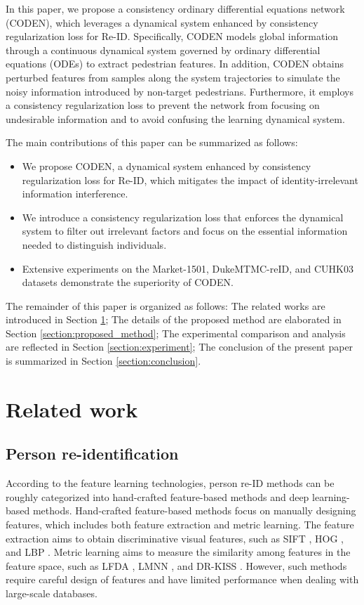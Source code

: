 \documentclass[12pt]{spieman}  %
\begin{document}
\begin{spacing}{2}
		In this paper, we propose a consistency ordinary differential equations network (CODEN), which leverages a dynamical system enhanced by consistency regularization loss for Re-ID. Specifically, CODEN models global  information through a continuous dynamical system governed by ordinary differential equations (ODEs) to extract pedestrian features. In addition, CODEN obtains perturbed features from samples along the system trajectories to simulate the noisy information introduced by non-target pedestrians. Furthermore, it employs a consistency regularization loss to prevent the network from focusing on undesirable information and to avoid confusing the learning dynamical system.
		
		The main contributions of this paper can be summarized as follows:
		
		\begin{itemize}
			\item We propose CODEN, a dynamical system enhanced by consistency regularization loss for Re-ID, which mitigates the impact of identity-irrelevant information interference.
			\item We introduce a consistency regularization loss that enforces the dynamical system to filter out irrelevant factors and focus on the essential information needed to distinguish individuals.
			\item Extensive experiments on the Market-1501, DukeMTMC-reID, and CUHK03 datasets demonstrate the superiority of CODEN.
		\end{itemize}
		
		The remainder of this paper is organized as follows: The related works are introduced in Section \ref{section:related_work}; The details of the proposed method are elaborated in Section \ref{section:proposed_method}; The experimental comparison and analysis are reflected in Section \ref{section:experiment}; The conclusion of the present paper is summarized in Section \ref{section:conclusion}.
		
		\section{Related work} \label{section:related_work}
		\subsection{Person re-identification}
		According to the feature learning technologies, person re-ID methods can be roughly categorized into hand-crafted feature-based methods and deep learning-based methods. Hand-crafted feature-based methods focus on manually designing features, which includes both feature extraction and metric learning. The feature extraction aims to obtain discriminative visual features, such as SIFT \cite{lowe2004distinctive}, HOG \cite{dalal2005histograms}, and LBP \cite{ojala2002multiresolution}. Metric learning aims to measure the similarity among features in the feature space, such as LFDA \cite{pedagadi2013local}, LMNN \cite{liao2015person}, and DR-KISS \cite{tao2016person}. However, such methods require careful design of features and have limited performance when dealing with large-scale databases.
		

\end{spacing}
\end{document}
